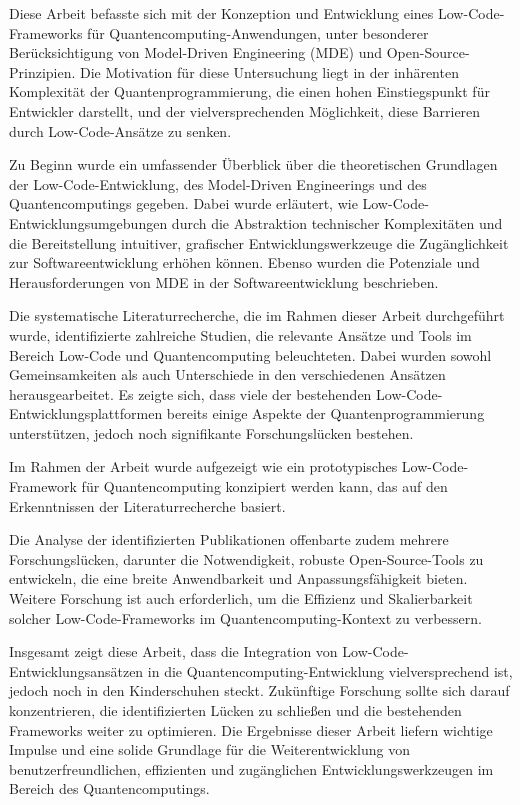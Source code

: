 Diese Arbeit befasste sich mit der Konzeption und Entwicklung eines Low-Code-Frameworks für Quantencomputing-Anwendungen, 
unter besonderer Berücksichtigung von Model-Driven Engineering (MDE) und Open-Source-Prinzipien. Die Motivation für diese 
Untersuchung liegt in der inhärenten Komplexität der Quantenprogrammierung, die einen hohen Einstiegspunkt für Entwickler 
darstellt, und der vielversprechenden Möglichkeit, diese Barrieren durch Low-Code-Ansätze zu senken.

Zu Beginn wurde ein umfassender Überblick über die theoretischen Grundlagen der Low-Code-Entwicklung, des Model-Driven 
Engineerings und des Quantencomputings gegeben. Dabei wurde erläutert, wie Low-Code-Entwicklungsumgebungen durch die 
Abstraktion technischer Komplexitäten und die Bereitstellung intuitiver, grafischer Entwicklungswerkzeuge die Zugänglichkeit 
zur Softwareentwicklung erhöhen können. Ebenso wurden die Potenziale und Herausforderungen von MDE in der Softwareentwicklung beschrieben.

Die systematische Literaturrecherche, die im Rahmen dieser Arbeit durchgeführt wurde, identifizierte zahlreiche Studien, 
die relevante Ansätze und Tools im Bereich Low-Code und Quantencomputing beleuchteten. Dabei wurden sowohl Gemeinsamkeiten 
als auch Unterschiede in den verschiedenen Ansätzen herausgearbeitet. Es zeigte sich, dass viele der bestehenden 
Low-Code-Entwicklungsplattformen bereits einige Aspekte der Quantenprogrammierung unterstützen, jedoch noch signifikante 
Forschungslücken bestehen.

Im Rahmen der Arbeit wurde aufgezeigt wie ein prototypisches Low-Code-Framework für Quantencomputing konzipiert werden kann, das auf den Erkenntnissen der 
Literaturrecherche basiert. 

Die Analyse der identifizierten Publikationen offenbarte zudem mehrere Forschungslücken, darunter die Notwendigkeit, robuste 
Open-Source-Tools zu entwickeln, die eine breite Anwendbarkeit und Anpassungsfähigkeit bieten. Weitere Forschung ist auch 
erforderlich, um die Effizienz und Skalierbarkeit solcher Low-Code-Frameworks im Quantencomputing-Kontext zu verbessern.

Insgesamt zeigt diese Arbeit, dass die Integration von Low-Code-Entwicklungsansätzen in die Quantencomputing-Entwicklung 
vielversprechend ist, jedoch noch in den Kinderschuhen steckt. Zukünftige Forschung sollte sich darauf konzentrieren, die 
identifizierten Lücken zu schließen und die bestehenden Frameworks weiter zu optimieren. Die Ergebnisse dieser Arbeit 
liefern wichtige Impulse und eine solide Grundlage für die Weiterentwicklung von benutzerfreundlichen, effizienten und 
zugänglichen Entwicklungswerkzeugen im Bereich des Quantencomputings.